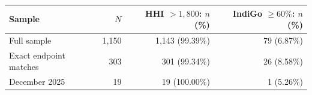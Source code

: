 \begin{tabular}{@{}lrrr@{}}
\toprule
Sample & $N$ & HHI $>1{,}800$: $n$ (\%) & IndiGo $\geq60\%$: $n$ (\%) \\
\midrule
Full sample & 1,150 & 1,143 (99.39\%) & 79 (6.87\%) \\
Exact endpoint matches & 303 & 301 (99.34\%) & 26 (8.58\%) \\
December 2025 & 19 & 19 (100.00\%) & 1 (5.26\%) \\
\bottomrule
\end{tabular}
